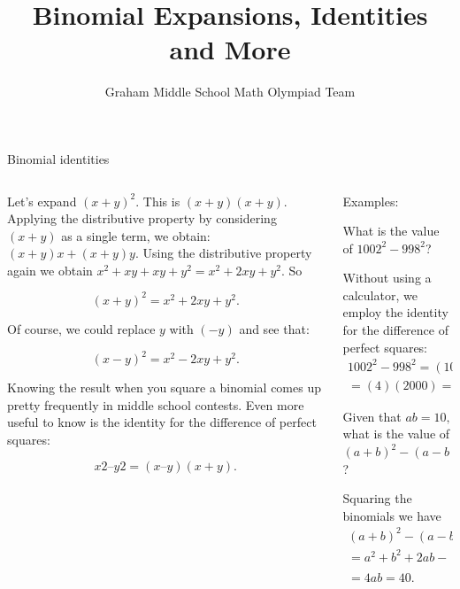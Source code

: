 \documentclass[9pt,aspectratio=169]{beamer}
\title{Binomial Expansions, Identities and More}
\subtitle[Graham Middle School]{Graham Middle School Math Olympiad Team}
\begin{document}
\maketitle

\begin{frame}{Binomial identities}
  \begin{columns}[T]
    \begin{column}{0.5\textwidth}
      Let’s expand $(x + y)^2$.  This is $(x + y)(x + y)$.  Applying the distributive property by considering $(x + y)$ as a single term, we obtain:  $(x + y)x + (x + y)y$.  Using the distributive property again we obtain $x^2 + xy + xy + y^2 = x^2 + 2xy + y^2$.  So
      \begin{definition}
        \vspace*{-0.5\intextsep}
        \[ (x + y)^2 =  x^2 + 2xy + y^2. \]
        \vspace*{-\intextsep}
      \end{definition}
      Of course, we could replace $y$ with $(-y)$ and see that:
      \begin{definition}
        \vspace*{-0.5\intextsep}
        \[(x - y)^2 =  x^2 - 2xy + y^2.\]
        \vspace*{-\intextsep}
      \end{definition}
      Knowing the result when you square a binomial comes up pretty frequently in middle school contests.  Even more useful to know is the identity for the difference of perfect squares:
      \begin{definition}
        \vspace*{-0.5\intextsep}
        \[ x2 – y2 = (x – y)(x + y).\]
        \vspace*{-\intextsep}
      \end{definition}
    \end{column}
    \begin{column}{0.5\textwidth}
      Examples:
      \begin{problem}
        What is the value of $1002^2 - 998^2$?
      \end{problem}

      Without using a calculator, we employ the identity for the difference of perfect squares:
      \begin{multline*}  
        1002^2 - 998^2 = (1002 - 998)(1002 + 998) =\\
        = (4)(2000) = 8000.
      \end{multline*} 
      \begin{problem}
        Given that $ab = 10,$ what is the value of $(a + b)^2 - (a - b)^2$?
      \end{problem}
      Squaring the binomials we have 
      \begin{multline*}  
        (a + b)^2 - (a - b)^2 =\\
        = a^2 + b^2 + 2ab - (a^2 + b^2 - 2ab) =\\
        = 4ab = 40.
      \end{multline*} 
    \end{column}
  \end{columns}
\end{frame}
\end{document}
